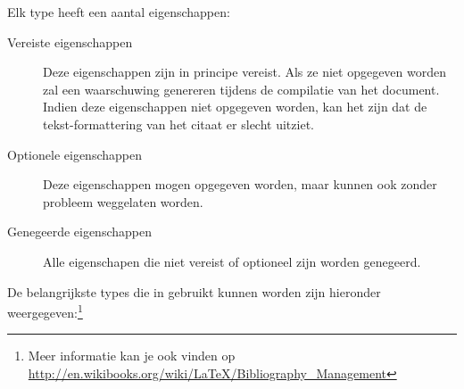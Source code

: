 \documentclass[12pt, dutch]{article}
\begin{document}
Elk type heeft een aantal eigenschappen:

\begin{description}
  \item[Vereiste eigenschappen] Deze eigenschappen zijn in principe
        vereist. Als ze niet opgegeven worden zal \BibTeX{} een waarschuwing
        genereren tijdens de compilatie van het document. Indien deze
        eigenschappen niet opgegeven worden, kan het zijn dat de
        tekst-formattering van het citaat er slecht uitziet.

  \item[Optionele eigenschappen] Deze eigenschappen mogen opgegeven
        worden, maar kunnen ook zonder probleem weggelaten worden.

  \item[Genegeerde eigenschappen] Alle eigenschapen die niet vereist
        of optioneel zijn worden genegeerd.
\end{description}

De belangrijkste types die in \BibTeX{} gebruikt kunnen worden zijn
hieronder weergegeven:\footnote{Meer informatie kan je ook vinden op \url{http://en.wikibooks.org/wiki/LaTeX/Bibliography_Management}}
\end{document}
